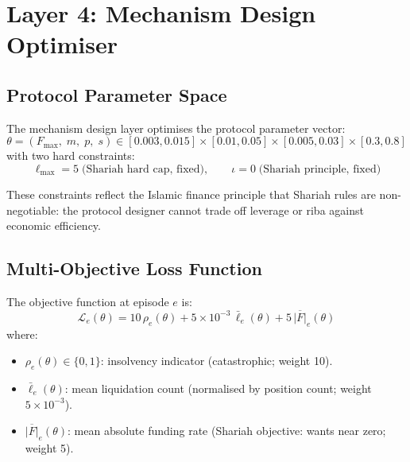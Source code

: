 \documentclass[10pt,twocolumn]{article}
\theoremstyle{plain}
\theoremstyle{definition}
\begin{document}
\section{Layer 4: Mechanism Design Optimiser}
\label{sec:md}

\subsection{Protocol Parameter Space}

The mechanism design layer optimises the protocol parameter
vector:
\begin{equation}
  \theta = (F_{\max},\; m,\; p,\; s)
  \in [0.003, 0.015] \times [0.01, 0.05]
    \times [0.005, 0.03] \times [0.3, 0.8]
  \label{eq:param_space}
\end{equation}
with two hard constraints:
\begin{equation}
  \ell_{\max} = 5 \;\text{(Shariah hard cap, fixed)},\qquad
  \iota = 0 \;\text{(Shariah principle, fixed)}
  \label{eq:hard_constraints}
\end{equation}

These constraints reflect the Islamic finance principle that
Shariah rules are non-negotiable: the protocol designer
cannot trade off leverage or riba against economic efficiency.

\subsection{Multi-Objective Loss Function}

The objective function at episode $e$ is:
\begin{equation}
  \mathcal{L}_e(\theta) = 10\,\rho_e(\theta)
    + 5\times10^{-3}\,\bar\ell_e(\theta)
    + 5\,\overline{|F|}_e(\theta)
  \label{eq:md_obj}
\end{equation}
where:
\begin{itemize}[leftmargin=*,noitemsep]
\item $\rho_e(\theta) \in \{0,1\}$: insolvency indicator
  (catastrophic; weight 10).
\item $\bar\ell_e(\theta)$: mean liquidation count
  (normalised by position count; weight $5\times10^{-3}$).
\item $\overline{|F|}_e(\theta)$: mean absolute funding
  rate (Shariah objective: wants near zero; weight 5).
\end{itemize}
\end{document}
